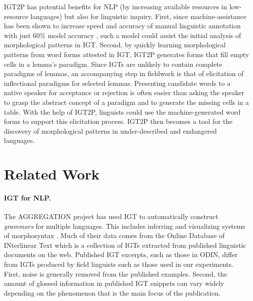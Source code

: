 IGT2P has potential benefits for NLP (by increasing available resources in low-resource languages) but also for linguistic inquiry. First, since machine-assistance has been shown to increase speed and accuracy of manual linguistic annotation with just 60\% model accuracy \citep{felt_improving_2012}, such a model could assist the initial analysis of morphological patterns in IGT. Second, by quickly learning morphological patterns from word forms attested in IGT, IGT2P generates forms that fill empty cells in a lemma's paradigm. Since IGTs are unlikely to contain complete paradigms of lemmas, an accompanying step in fieldwork is that of elicitation of inflectional paradigms for selected lemmas. Presenting candidate words to a native speaker for acceptance or rejection is often easier than asking the speaker to grasp the abstract concept of a paradigm and to generate the missing cells in a table. With the help of IGT2P, linguists could use the machine-generated word forms to support this elicitation process. IGT2P then becomes a tool for the discovery of morphological patterns in under-described and endangered languages.

\section{Related Work}

\paragraph{IGT for NLP.} 
The AGGREGATION project \citep{bender_language_2014} has used IGT to automatically construct \textit{grammars} for multiple languages. This includes inferring and visualizing systems of morphosyntax \citep{lepp_visualizing_2019,wax_automated_2014}. Much of their data comes from the Online Database of INterlinear Text \citep[ODIN]{lewis_developing_2010} which is a collection of IGTs extracted from published linguistic documents on the web. Published IGT excerpts, such as those in ODIN, differ from IGTs produced by field linguists such as those used in our experiments. First, noise is generally removed from the published examples. 
Second, the amount of glossed information in published IGT snippets can vary widely depending on the phenomenon that is the main focus of the publication.

